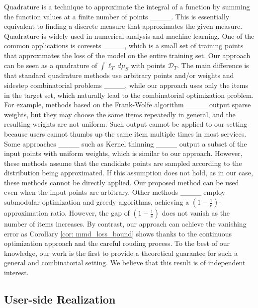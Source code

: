 Quadrature is a technique to approximate the integral of a function by summing the function values at a finite number of points ____. This is essentially equivalent to finding a discrete measure that approximates the given measure. Quadrature is widely used in numerical analysis and machine learning. One of the common applications is coresets ____, which is a small set of training points that approximates the loss of the model on the entire training set. Our approach can be seen as a quadrature of $\int \ell_T \, d\mu_S$ with points $\mathcal{D}_T$. The main difference is that standard quadrature methods use arbitrary points and/or weights and sidestep combinatorial problems ____, while our approach uses only the items in the target set, which naturally lead to the combinatorial optimization problem. For example, methods based on the Frank-Wolfe algorithm ____ output sparse weights, but they may choose the same items repeatedly in general, and the resulting weights are not uniform. Such output cannot be applied to our setting because users cannot thumbs up the same item multiple times in most services. Some approaches ____ such as Kernel thinning ____ output a subset of the input points with uniform weights, which is similar to our approach. However, these methods assume that the candidate points are sampled according to the distribution being approximated. If this assumption does not hold, as in our case, these methods cannot be directly applied. Our proposed method can be used even when the input points are arbitrary. Other methods ____ employ submodular optimization and greedy algorithms, achieving a $(1 - \frac{1}{e})$-approximation ratio. However, the gap of $(1 - \frac{1}{e})$ does not vanish as the number of items increases. By contrast, our approach can achieve the vanishing error as Corollary \ref{cor: mmd_loss_bound} shows thanks to the continuous optimization approach and the careful rouding process. To the best of our knowledge, our work is the first to provide a theoretical guarantee for such a general and combinatorial setting. We believe that this result is of independent interest.

\subsection{User-side Realization}


